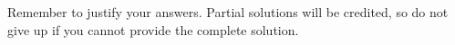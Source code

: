 \documentclass[twoside,12pt]{article}
\begin{document}
{}

Remember to justify your answers. Partial solutions will be credited, so do not
give up if you cannot provide the complete solution.

\end{document}
